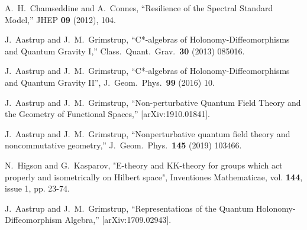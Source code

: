 \documentclass[12pt]{article}
\begin{document}
\begin{thebibliography}{99}
A.~H.~Chamseddine and A.~Connes,
``Resilience of the Spectral Standard Model,''
JHEP \textbf{09} (2012), 104.



  J.~Aastrup and J.~M.~Grimstrup,
  ``C*-algebras of Holonomy-Diffeomorphisms and Quantum Gravity I,''
  Class.\ Quant.\ Grav.\  {\bf 30} (2013) 085016.



  
 

  J.~Aastrup and J.~M.~Grimstrup,
  ``C*-algebras of Holonomy-Diffeomorphisms and Quantum Gravity II'',
   J.\ Geom.\ Phys.\  {\bf 99} (2016) 10.













J.~Aastrup and J.~M.~Grimstrup,
``Non-perturbative Quantum Field Theory and the Geometry of Functional Spaces,''
[arXiv:1910.01841].




  J.~Aastrup and J.~M.~Grimstrup,
  ``Nonperturbative quantum field theory and noncommutative geometry,''
  J.\ Geom.\ Phys.\  {\bf 145} (2019) 103466.




  
N.~Higson and G.~Kasparov, "E-theory and KK-theory for groups which act properly and isometrically on Hilbert space", 
Inventiones Mathematicae, vol. {\bf 144}, issue 1, pp. 23-74.






  J.~Aastrup and J.~M.~Grimstrup,
  ``Representations of the Quantum Holonomy-Diffeomorphism Algebra,''
  [arXiv:1709.02943].






\end{thebibliography}
\end{document}
